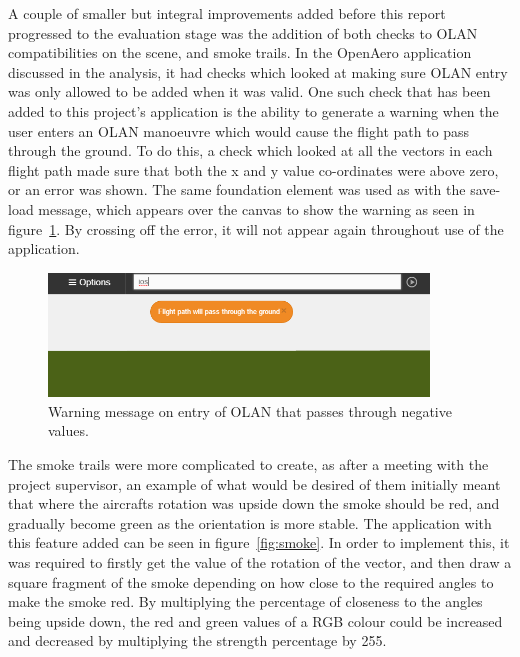 A couple of smaller but integral improvements added before this report progressed to the evaluation stage was the addition of both checks to OLAN compatibilities on the scene, and smoke trails. In the OpenAero application discussed in the analysis, it had checks which looked at making sure OLAN entry was only allowed to be added when it was valid. One such check that has been added to this project's application is the ability to generate a warning when the user enters an OLAN manoeuvre which would cause the flight path to pass through the ground. To do this, a check which looked at all the vectors in each flight path made sure that both the x and y value co-ordinates were above zero, or an error was shown. The same foundation element was used as with the save-load message, which appears over the canvas to show the warning as seen in figure~\ref{fig:warnMan}. By crossing off the error, it will not appear again throughout use of the application.  

\begin{figure}[h!]
  \centering
  \includegraphics[width=0.9\textwidth]{images/warn.png}
  \caption{Warning message on entry of OLAN that passes through negative values.}
  \label{fig:warnMan}
\end{figure}

The smoke trails were more complicated to create, as after a meeting with the project supervisor, an example of what would be desired of them initially meant that where the aircrafts rotation was upside down the smoke should be red, and gradually become green as the orientation is more stable. The application with this feature added can be seen in figure~\ref{fig:smoke}. In order to implement this, it was required to firstly get the value of the rotation of the vector, and then draw a square fragment of the smoke depending on how close to the required angles to make the smoke red. By multiplying the percentage of closeness to the angles being upside down, the red and green values of a RGB colour could be increased and decreased by multiplying the strength percentage by 255.


